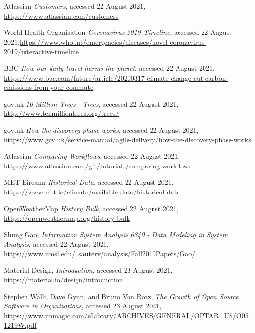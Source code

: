 \documentclass[]{UCD_CS_47360_Report}
\begin{document}
\begin{thebibliography}{99}
 Atlassian \emph{Customers}, accessed 22 August 2021, \href{https://www.atlassian.com/customers}{https://www.atlassian.com/customers}

World Health Organisation \emph{Coronavirus 2019 Timeline}, accessed 22 August 2021,\href{https://www.who.int/emergencies/diseases/novel-coronavirus-2019/interactive-timeline}{https://www.who.int/emergencies/diseases/novel-coronavirus-2019/interactive-timeline}


BBC \emph{How our daily travel harms the planet}, accessed 22 August 2021, \href{https://www.bbc.com/future/article/20200317-climate-change-cut-carbon-emissions-from-your-commute}{https://www.bbc.com/future/article/20200317-climate-change-cut-carbon-emissions-from-your-commute}


gov.uk \emph{10 Million Trees - Trees}, accessed 22 August 2021, \href{http://www.tenmilliontrees.org/trees/}{http://www.tenmilliontrees.org/trees/}

gov.uk \emph{How the discovery phase works}, accessed 22 August 2021, \href{https://www.gov.uk/service-manual/agile-delivery/how-the-discovery-phase-works}{https://www.gov.uk/service-manual/agile-delivery/how-the-discovery-phase-works}


Atlassian \emph{Comparing Workflows}, accessed 22 August 2021, \href{https://www.atlassian.com/git/tutorials/comparing-workflows}{https://www.atlassian.com/git/tutorials/comparing-workflows} 

MET Eireann \emph{Historical Data}, accessed 22 August 2021, \href{https://www.met.ie/climate/available-data/historical-data}{https://www.met.ie/climate/available-data/historical-data}

OpenWeatherMap \emph{History Bulk}, accessed 22 August 2021, \href{https://openweathermap.org/history-bulk}{https://openweathermap.org/history-bulk}

Shung Gao,  \emph{Information System Analysis 6840 -  Data Modeling in System Analysis}, accessed 22 August 2021, \href{https://www.umsl.edu/~sauterv/analysis/Fall2010Papers/Gao/}{https://www.umsl.edu/~sauterv/analysis/Fall2010Papers/Gao/}

Material Design,  \emph{Introduction}, accessed 23 August 2021, \href{https://material.io/design/introduction}{https://material.io/design/introduction}

 Stephen Walli, Dave Gynn, and Bruno Von Rotz, \emph{The Growth of Open Source Software in Organizations}, accessed 23 August 2021, \href{https://www.immagic.com/eLibrary/ARCHIVES/GENERAL/OPTAR_US/O051219W.pdf}{https://www.immagic.com/eLibrary/ARCHIVES/GENERAL/OPTAR_US/O051219W.pdf}



\end{thebibliography}
\end{document}
